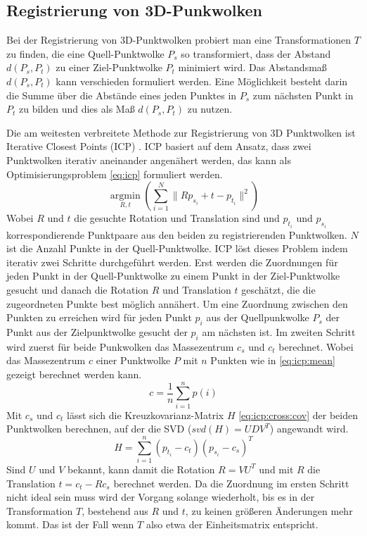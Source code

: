 \documentclass[12pt,titlepage, twoside]{article}
\begin{document}
\subsection{Registrierung von 3D-Punkwolken}
\label{sec:stand:registrierung}

Bei der Registrierung von 3D-Punktwolken probiert man eine Transformationen $T$ zu finden, die eine Quell-Punktwolke $P_s$ so transformiert, dass der Abstand $d(P_s,P_t)$ zu einer Ziel-Punktwolke $P_t$ minimiert wird.
Das Abstandsmaß $d(P_s, P_t)$ kann verschieden formuliert werden. Eine Möglichkeit besteht darin die Summe über die Abstände eines jeden Punktes in $P_s$ 
zum nächsten Punkt in $P_t$ zu bilden und dies als Maß $d(P_s, P_t)$ zu nutzen. 

Die am weitesten verbreitete Methode zur Registrierung von 3D Punktwolken ist Iterative Closest Points (ICP) \cite{icp_org}. 
ICP basiert auf dem Ansatz, dass zwei Punktwolken iterativ aneinander angenähert werden, das kann als Optimisierungsproblem \ref{eq:icp} formuliert werden.
\begin{equation}
    \label{eq:icp}
    \underset{R,t}{\operatorname{argmin}}(\sum_{i=1}^N{\|Rp_{s_i} + t - p_{t_i}\|^2})
\end{equation}
Wobei $R$ und $t$ die gesuchte Rotation und Translation sind und $p_{t_i}$ und $p_{s_i}$ korrespondierende Punktpaare aus den beiden zu registrierenden Punktwolken. $N$ ist die Anzahl Punkte in der Quell-Punktwolke.
ICP löst dieses Problem indem iterativ zwei Schritte durchgeführt werden. 
Erst werden die Zuordnungen für jeden Punkt in der Quell-Punktwolke zu einem Punkt in der Ziel-Punktwolke gesucht und danach die Rotation $R$ und Translation $t$ geschätzt, die die zugeordneten Punkte best möglich annähert.
Um eine Zuordnung zwischen den Punkten zu erreichen wird für jeden Punkt $p_i$ aus der Quellpunkwolke $P_s$ der Punkt aus der Zielpunktwolke gesucht der $p_i$ am nächsten ist. 
Im zweiten Schritt wird zuerst für beide Punkwolken das Massezentrum $c_s$ und $c_t$ berechnet. Wobei das Massezentrum $c$ einer Punktwolke $P$ mit $n$ Punkten wie in \ref{eq:icp:mean} gezeigt berechnet werden kann.
\begin{equation}
    \label{eq:icp:mean}
    c = \frac{1}{n}\sum_{i=1}^n{p(i)}
\end{equation}
Mit $c_s$ und $c_t$ lässt sich die Kreuzkovarianz-Matrix $H$ \ref{eq:icp:cross:cov} der beiden Punktwolken berechnen, auf der die SVD ($svd(H) = UDV^T$) angewandt wird.
\begin{equation}
    \label{eq:icp:cross:cov}
    H = \sum_{i=1}^n{(p_{t_i} - c_t)(p_{s_i} - c_s)^T}
\end{equation}
Sind $U$ und $V$ bekannt, kann damit die Rotation $R = VU^T$ und mit $R$ die Translation $t=c_t-Rc_s$ berechnet werden.
Da die Zuordnung im ersten Schritt nicht ideal sein muss wird der Vorgang solange wiederholt, bis es in der Transformation $T$, bestehend aus $R$ und $t$, zu keinen größeren Änderungen mehr kommt.
Das ist der Fall wenn $T$ also etwa der Einheitsmatrix entspricht.
\end{document}
